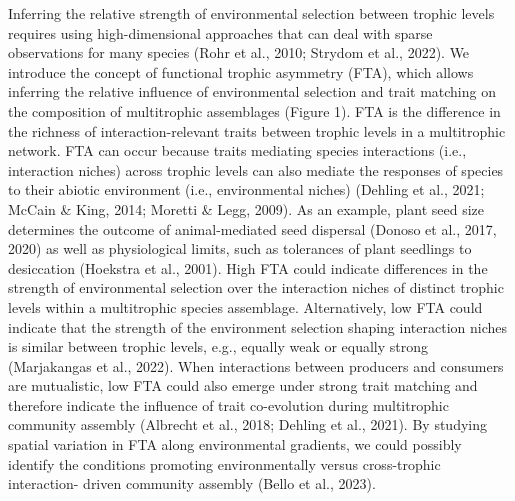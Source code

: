 \documentclass[
]{agujournal2019}
\begin{document}
Inferring the relative strength of environmental selection between
trophic levels requires using high-dimensional approaches that can deal
with sparse observations for many species (Rohr et al., 2010; Strydom et
al., 2022). We introduce the concept of functional trophic asymmetry
(FTA), which allows inferring the relative influence of environmental
selection and trait matching on the composition of multitrophic
assemblages (Figure 1). FTA is the difference in the richness of
interaction-relevant traits between trophic levels in a multitrophic
network. FTA can occur because traits mediating species interactions
(i.e., interaction niches) across trophic levels can also mediate the
responses of species to their abiotic environment (i.e., environmental
niches) (Dehling et al., 2021; McCain \& King, 2014; Moretti \& Legg,
2009). As an example, plant seed size determines the outcome of
animal-mediated seed dispersal (Donoso et al., 2017, 2020) as well as
physiological limits, such as tolerances of plant seedlings to
desiccation (Hoekstra et al., 2001). High FTA could indicate differences
in the strength of environmental selection over the interaction niches
of distinct trophic levels within a multitrophic species assemblage.
Alternatively, low FTA could indicate that the strength of the
environment selection shaping interaction niches is similar between
trophic levels, e.g., equally weak or equally strong (Marjakangas et
al., 2022). When interactions between producers and consumers are
mutualistic, low FTA could also emerge under strong trait matching and
therefore indicate the influence of trait co-evolution during
multitrophic community assembly (Albrecht et al., 2018; Dehling et al.,
2021). By studying spatial variation in FTA along environmental
gradients, we could possibly identify the conditions promoting
environmentally versus cross-trophic interaction- driven community
assembly (Bello et al., 2023).
\end{document}
